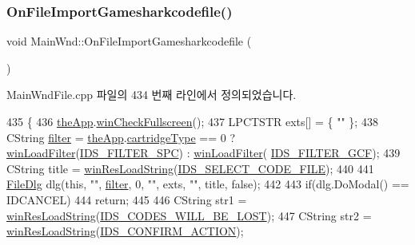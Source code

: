 \subsubsection{\texorpdfstring{On\+File\+Import\+Gamesharkcodefile()}{OnFileImportGamesharkcodefile()}}
{\footnotesize\ttfamily void Main\+Wnd\+::\+On\+File\+Import\+Gamesharkcodefile (\begin{DoxyParamCaption}{ }\end{DoxyParamCaption})\hspace{0.3cm}{\ttfamily [protected]}}



Main\+Wnd\+File.\+cpp 파일의 434 번째 라인에서 정의되었습니다.


\begin{DoxyCode}
435 \{
436   \mbox{\hyperlink{_v_b_a_8cpp_a8095a9d06b37a7efe3723f3218ad8fb3}{theApp}}.\mbox{\hyperlink{class_v_b_a_a340eaeeb7fcfc242f08ac3442d991a96}{winCheckFullscreen}}();
437   LPCTSTR exts[] = \{ \textcolor{stringliteral}{""} \};
438   CString \mbox{\hyperlink{_s_d_l_8cpp_af0122ee4312107103b580a98c74a4ea6}{filter}} = \mbox{\hyperlink{_v_b_a_8cpp_a8095a9d06b37a7efe3723f3218ad8fb3}{theApp}}.\mbox{\hyperlink{class_v_b_a_af300759fcbc7eeb00ce73f956fc5ddb7}{cartridgeType}} == 0 ? 
      \mbox{\hyperlink{class_main_wnd_a7adc4aa2a10246fa13637e9d0870843d}{winLoadFilter}}(\mbox{\hyperlink{resource_8h_ae45b75a9ea7b45dc665207d0ffcd3640}{IDS\_FILTER\_SPC}}) : \mbox{\hyperlink{class_main_wnd_a7adc4aa2a10246fa13637e9d0870843d}{winLoadFilter}}(
      \mbox{\hyperlink{resource_8h_a2202aef33ded3ebe22953c08e4ba6938}{IDS\_FILTER\_GCF}});
439   CString title = \mbox{\hyperlink{_win_res_util_8cpp_a416e85e80ab9b01376e87251c83d1a5a}{winResLoadString}}(\mbox{\hyperlink{resource_8h_a045e090d3fc0da02634e54f5b7e6754f}{IDS\_SELECT\_CODE\_FILE}});
440 
441   \mbox{\hyperlink{class_file_dlg}{FileDlg}} dlg(\textcolor{keyword}{this}, \textcolor{stringliteral}{""}, \mbox{\hyperlink{_s_d_l_8cpp_af0122ee4312107103b580a98c74a4ea6}{filter}}, 0, \textcolor{stringliteral}{""}, exts, \textcolor{stringliteral}{""}, title, \textcolor{keyword}{false});
442   
443   \textcolor{keywordflow}{if}(dlg.DoModal() == IDCANCEL)
444     \textcolor{keywordflow}{return};
445 
446   CString str1 = \mbox{\hyperlink{_win_res_util_8cpp_a416e85e80ab9b01376e87251c83d1a5a}{winResLoadString}}(\mbox{\hyperlink{resource_8h_a63e03fd3939a1c2194ec78b4c3d91fd0}{IDS\_CODES\_WILL\_BE\_LOST}});
447   CString str2 = \mbox{\hyperlink{_win_res_util_8cpp_a416e85e80ab9b01376e87251c83d1a5a}{winResLoadString}}(\mbox{\hyperlink{resource_8h_abc0b84029b8a14e65133a98d2b691eeb}{IDS\_CONFIRM\_ACTION}});

\end{DoxyCode}
